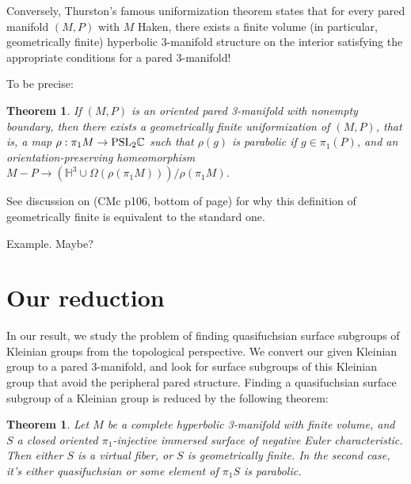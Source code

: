 \documentclass[12pt]{amsart}
\newtheorem{thm}[theorem]{Theorem}
\theoremstyle{definition}
\newcommand{\Om}{\Omega}
\newcommand{\PSL}{\mbox{\rm{PSL}}}
\begin{document}
Conversely, Thurston's famous uniformization theorem states that for every
pared manifold $(M,P)$ with $M$ Haken, there exists a finite volume (in
particular, geometrically finite) hyperbolic 3-manifold structure on the
interior satisfying the appropriate conditions for a pared 3-manifold!


To be precise:


\begin{thm}

If $(M,P)$ is an oriented pared 3-manifold with nonempty boundary, then
there exists a geometrically finite uniformization of $(M,P)$, that is, a map
$\rho: \pi_1M \to \PSL_2\mathbb{C}$ such that $\rho(g)$ is parabolic if $g \in
\pi_1(P)$, and an
orientation-preserving homeomorphism $M-P \to \left(\mathbb{H}^3
\cup \Om(\rho(\pi_1M))\right)/\rho(\pi_1M)$.

\end{thm}

See discussion on (CMc p106, bottom of page) for why this definition of
geometrically finite is equivalent to the standard one.

Example. Maybe? %

\section{Our reduction}

In our result, we study the problem of finding quasifuchsian surface subgroups
of Kleinian groups from the topological perspective. We convert our given
Kleinian group to a pared 3-manifold, and look for surface subgroups of this
Kleinian group that avoid the peripheral pared structure. Finding
a quasifuchsian surface subgroup of a Kleinian group is reduced by the
following theorem:

\begin{thm}

Let $M$ be a complete hyperbolic 3-manifold with finite volume, and $S$
a closed oriented $\pi_1$-injective immersed surface of negative Euler
characteristic. Then either $S$ is a virtual fiber, or $S$ is geometrically
finite. In the second case, it's either quasifuchsian or some element of
$\pi_1S$ is parabolic.

\end{thm}
\end{document}

